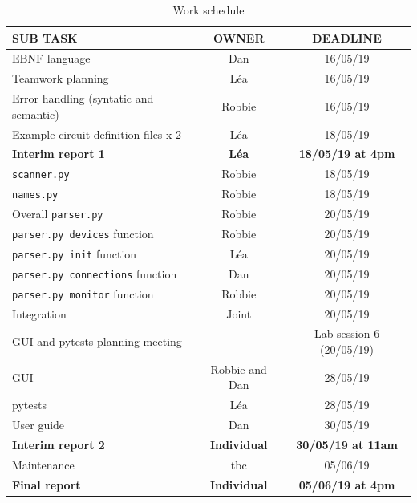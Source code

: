 \documentclass[12pt]{article}
\begin{document}
\begin{table}[H]
    \centering
    \begin{tabular}{||l|c|c||}
    \hline
          SUB TASK & OWNER & DEADLINE \\ [0.5ex]
          \hline \hline
         EBNF language & Dan & 16/05/19 \\
         Teamwork planning & L\'ea & 16/05/19 \\
         Error handling (syntatic and semantic) & Robbie & 16/05/19 \\
         Example circuit definition files x 2 & L\'ea & 18/05/19\\
         \hline
        \textbf{Interim report 1} & \textbf{L\'ea} & \textbf{18/05/19 at 4pm}\\ [0.5ex]
        \hline 
        \texttt{scanner.py} & Robbie & 18/05/19\\
        \texttt{names.py} & Robbie & 18/05/19\\
        Overall \texttt{parser.py} & Robbie & 20/05/19 \\
        \texttt{parser.py devices} function & Robbie & 20/05/19 \\
        \texttt{parser.py init} function & L\'ea & 20/05/19 \\
        \texttt{parser.py connections} function & Dan & 20/05/19 \\
        \texttt{parser.py monitor} function & Robbie & 20/05/19 \\
        Integration & Joint & 20/05/19\\
        \hline
        \multicolumn{2}{||l|}{GUI and pytests planning meeting} & Lab session 6 (20/05/19)\\
        \hline
        GUI & Robbie and Dan & 28/05/19 \\
        pytests & L\'ea & 28/05/19 \\
        User guide & Dan & 30/05/19 \\
        \hline
        \textbf{Interim report 2} & \textbf{Individual} & \textbf{30/05/19 at 11am}\\
        \hline
        Maintenance & tbc & 05/06/19\\
        \hline
       \textbf{Final report} & \textbf{Individual} & \textbf{05/06/19 at 4pm}\\
        \hline \hline
        
    \end{tabular}
    \caption{Work schedule}
    \label{tab:schedule}
\end{table}
\end{document}
